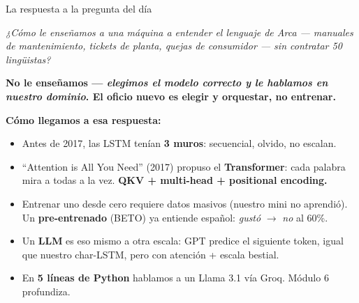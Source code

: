 \documentclass[aspectratio=169, 11pt]{beamer}
\begin{document}
\begin{frame}[shrink]{La respuesta a la pregunta del día}
  \vspace{2pt}
  \begin{tcolorbox}[colback=arcaDark, colframe=arcaDark, sharp corners,
    boxrule=0pt, left=10pt, right=10pt, top=5pt, bottom=5pt]
    {\footnotesize\color{white}\itshape
    ¿Cómo le enseñamos a una máquina a entender el lenguaje de Arca ---
    manuales de mantenimiento, tickets de planta, quejas de consumidor ---
    sin contratar 50 lingüistas?\par}
  \end{tcolorbox}
  \vspace{6pt}
  \begin{tcolorbox}[colback=arcaRed!8, colframe=arcaRed, leftrule=3pt,
    boxrule=0pt, sharp corners, left=8pt, right=8pt, top=6pt, bottom=6pt]
    {\small\color{arcaDark}\bfseries
    No le enseñamos --- \emph{elegimos el modelo correcto y le hablamos en nuestro
    dominio}. El oficio nuevo es \textbf{elegir y orquestar}, no entrenar.}
  \end{tcolorbox}
  \vspace{4pt}
  {\footnotesize\color{arcaDark}\bfseries Cómo llegamos a esa respuesta:\par}
  \vspace{2pt}
  \begin{itemize}\setlength{\itemsep}{3pt}
    \footnotesize
    \item Antes de 2017, las LSTM tenían \textbf{3 muros}: secuencial, olvido, no escalan.
    \item ``Attention is All You Need'' (2017) propuso el \textbf{Transformer}: cada palabra
    mira a todas a la vez. \textbf{QKV + multi-head + positional encoding.}
    \item Entrenar uno desde cero requiere datos masivos (nuestro mini no aprendió).
    Un \textbf{pre-entrenado} (BETO) ya entiende español: \emph{gustó} $\to$ \emph{no} al 60\%.
    \item Un \textbf{LLM} es eso mismo a otra escala: GPT predice el siguiente token,
    igual que nuestro char-LSTM, pero con atención + escala bestial.
    \item En \textbf{5 líneas de Python} hablamos a un Llama 3.1 vía Groq. Módulo 6 profundiza.
  \end{itemize}
\end{frame}
\end{document}
